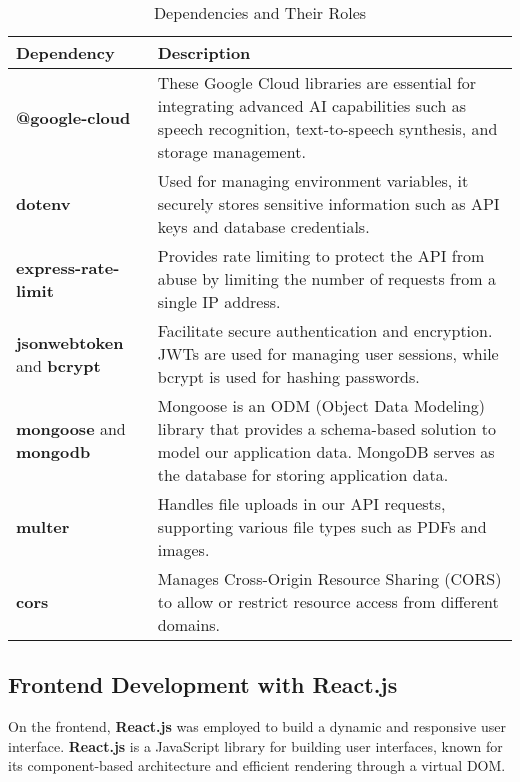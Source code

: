 \begin{table}[h!]
\centering
\begin{tabular}{|l|l|}
\hline
\textbf{Dependency} & \textbf{Description} \\
\hline
\textbf{@google-cloud} & These Google Cloud libraries are essential for integrating advanced AI capabilities such as speech recognition, text-to-speech synthesis, and storage management. \\
\hline
\textbf{dotenv} & Used for managing environment variables, it securely stores sensitive information such as API keys and database credentials. \\
\hline
\textbf{express-rate-limit} & Provides rate limiting to protect the API from abuse by limiting the number of requests from a single IP address. \\
\hline
\textbf{jsonwebtoken} and \textbf{bcrypt} & Facilitate secure authentication and encryption. JWTs are used for managing user sessions, while bcrypt is used for hashing passwords. \\
\hline
\textbf{mongoose} and \textbf{mongodb} & Mongoose is an ODM (Object Data Modeling) library that provides a schema-based solution to model our application data. MongoDB serves as the database for storing application data. \\
\hline
\textbf{multer} & Handles file uploads in our API requests, supporting various file types such as PDFs and images. \\
\hline
\textbf{cors} & Manages Cross-Origin Resource Sharing (CORS) to allow or restrict resource access from different domains. \\
\hline
\end{tabular}
\caption{Dependencies and Their Roles}
\label{table:dependencies}
\end{table}



\subsection{Frontend Development with React.js}

On the frontend, \textbf{React.js} was employed to build a dynamic and responsive user interface. \textbf{React.js} is a JavaScript library for building user interfaces, known for its component-based architecture and efficient rendering through a virtual DOM. 

